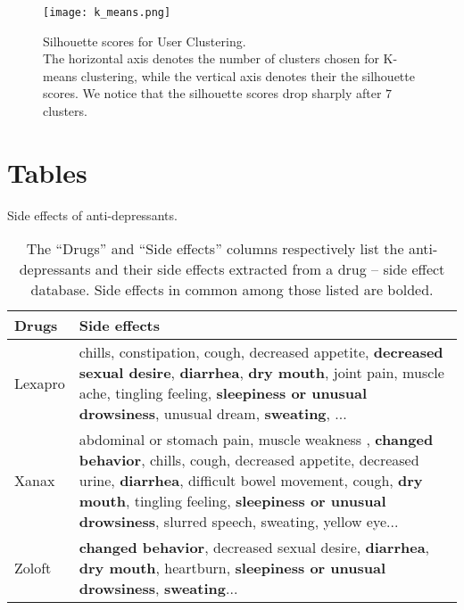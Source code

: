 \documentclass{bmcart}
\begin{document}
\begin{backmatter}
\begin{figure}[h!]
    \label{fig:PCA}
\end{figure}
\begin{figure}[h!]
    \centering
    \captionsetup{justification=centering}
    \texttt{[image: k\_means.png]}
    \caption{Silhouette scores for User Clustering. \\ The horizontal axis denotes the number of clusters chosen for K-means clustering, while the vertical axis denotes their the silhouette scores. We notice that the silhouette scores drop sharply after $7$ clusters.}
    \label{fig:KMeans}
\end{figure}

\pagebreak
\section*{Tables}
\begin{table}[h!]
  \caption{Side effects of anti-depressants.} 
  \footnotesize
  \begin{tabular}{l p{11cm}}
    \hline
    Drugs & Side effects \\ \hline
    Lexapro & chills, constipation, cough, decreased appetite, \textbf{decreased sexual desire}, \textbf{diarrhea}, \textbf{dry mouth}, joint pain, muscle ache, tingling feeling, \textbf{sleepiness or unusual drowsiness}, unusual dream, \textbf{sweating}, ... \\
    Xanax &  abdominal or stomach pain, muscle weakness
      , \textbf{changed behavior}, chills, cough, decreased appetite, decreased urine, \textbf{diarrhea}, difficult bowel movement, cough, \textbf{dry mouth}, tingling feeling, \textbf{sleepiness or unusual drowsiness}, slurred speech, sweating, yellow eye... \\
    Zoloft &  \textbf{changed behavior}, decreased sexual desire, \textbf{diarrhea}, \textbf{dry mouth}, heartburn, \textbf{sleepiness or unusual drowsiness}, \textbf{sweating}... \\ \hline
  \end{tabular}
  \caption*{The ``Drugs'' and ``Side effects'' columns respectively list the anti-depressants and their side effects extracted from a drug -- side effect database. Side effects in common among those listed are bolded.}
  \label{table:anti_depressant_side_effects}
\end{table}


\end{backmatter}
\end{document}
